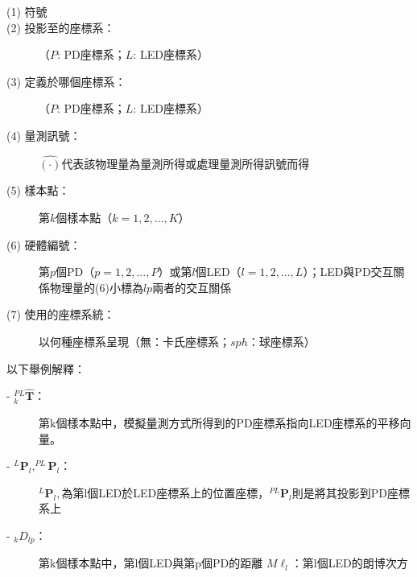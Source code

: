 \begin{description}
    \item[(1) 符號] 
    \item[(2) 投影至的座標系：] （$P$: PD座標系；$L$: LED座標系）
    \item[(3) 定義於哪個座標系：] （$P$: PD座標系；$L$: LED座標系）
    \item[(4) 量測訊號：] $\hat{(\cdot)}$代表該物理量為量測所得或處理量測所得訊號而得
    \item[(5) 樣本點：] 第$k$個樣本點（$k=1,2,...,K$）
    \item[(6) 硬體編號：] 第$p$個PD（$p=1,2,...,P$）或第$l$個LED（$l=1,2,...,L$）；LED與PD交互關係物理量的(6)小標為$lp$兩者的交互關係
    \item[(7) 使用的座標系統：]  以何種座標系呈現（無：卡氏座標系；$sph$：球座標系）
\end{description}


\onehalfspacing

以下舉例解釋：
\begin{description}
\item[- $^{PL}_{k}\hat{\boldsymbol{T}}$：]第k個樣本點中，模擬量測方式所得到的PD座標系指向LED座標系的平移向量。

\item[- $^{L}\boldsymbol{P}_l,^{PL}\boldsymbol{P}_l$：]$^{L}\boldsymbol{P}_l,$為第l個LED於LED座標系上的位置座標，$^{PL}\boldsymbol{P}_l$則是將其投影到PD座標系上

\item[- $_{k}D_{l p}$：]第k個樣本點中，第l個LED與第p個PD的距離
$M\ell_l$：第l個LED的朗博次方
\end{description}